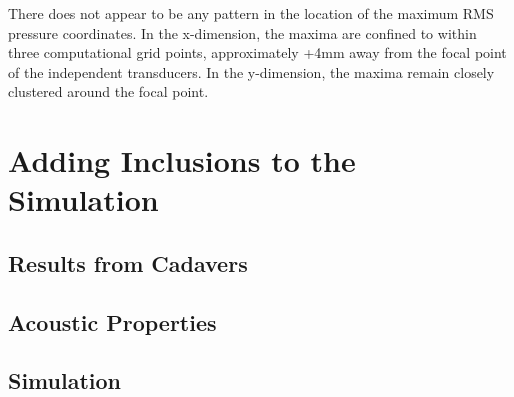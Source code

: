 \documentclass[10pt,a4paper]{article}
\begin{document}
There does not appear to be any pattern in the location of the maximum RMS pressure coordinates. In the x-dimension, the maxima are confined to within three computational grid points, approximately +4mm away from the focal point of the independent transducers. In the y-dimension, the maxima remain closely clustered around the focal point.



\section{Adding Inclusions to the Simulation}

\subsection{Results from Cadavers}

\subsection{Acoustic Properties}

\subsection{Simulation}
\end{document}
